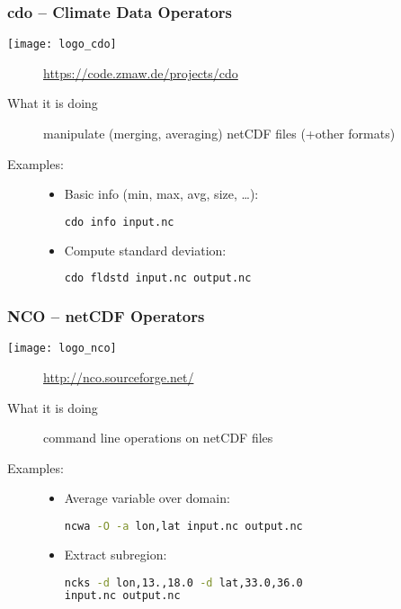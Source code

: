 \begin{frame}[c,fragile]
\frametitle{cdo -- Climate Data Operators}

\texttt{[image: logo\_cdo]}

\begin{description}
\item[\homepage] \url{https://code.zmaw.de/projects/cdo}
\item[What it is doing] manipulate (merging, averaging) netCDF files (+other formats)
\item[Examples:] 
\begin{itemize}
\item Basic info (min, max, avg, size, \ldots):
\begin{lstlisting}[language=bash,basicstyle=\tiny]
cdo info input.nc
\end{lstlisting}
\item Compute standard deviation:
\begin{lstlisting}[language=bash,basicstyle=\tiny]
cdo fldstd input.nc output.nc
\end{lstlisting}
\end{itemize}
\end{description}



\end{frame}
\begin{frame}[c,fragile]
\frametitle{NCO -- netCDF Operators}

\texttt{[image: logo\_nco]}

\begin{description}
\item[\homepage] \url{http://nco.sourceforge.net/}
\item[What it is doing] command line operations on netCDF files
\item[Examples:] \begin{itemize}
\item Average variable over domain:
\begin{lstlisting}[language=bash,basicstyle=\tiny]
ncwa -O -a lon,lat input.nc output.nc
\end{lstlisting}
\item Extract subregion:
\begin{lstlisting}[language=bash,basicstyle=\tiny]
ncks -d lon,13.,18.0 -d lat,33.0,36.0 
input.nc output.nc
\end{lstlisting}
\end{itemize}
\end{description}

\end{frame}

